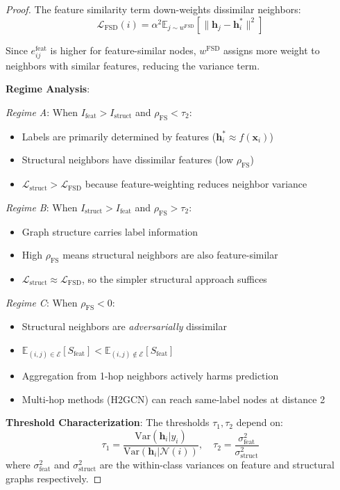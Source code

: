 \begin{proof}
The feature similarity term down-weights dissimilar neighbors:
\begin{equation}
\mathcal{L}_{\text{FSD}}(i) = \alpha^2 \mathbb{E}_{j \sim w^{\text{FSD}}}\left[\|\mathbf{h}_j - \mathbf{h}_i^*\|^2\right]
\end{equation}

Since $e_{ij}^{\text{feat}}$ is higher for feature-similar nodes, $w^{\text{FSD}}$ assigns more weight to neighbors with similar features, reducing the variance term.

\textbf{Regime Analysis}:

\textit{Regime A}: When $I_{\text{feat}} > I_{\text{struct}}$ and $\rho_{\text{FS}} < \tau_2$:
\begin{itemize}
\item Labels are primarily determined by features ($\mathbf{h}_i^* \approx f(\mathbf{x}_i)$)
\item Structural neighbors have dissimilar features (low $\rho_{\text{FS}}$)
\item $\mathcal{L}_{\text{struct}} > \mathcal{L}_{\text{FSD}}$ because feature-weighting reduces neighbor variance
\end{itemize}

\textit{Regime B}: When $I_{\text{struct}} > I_{\text{feat}}$ and $\rho_{\text{FS}} > \tau_2$:
\begin{itemize}
\item Graph structure carries label information
\item High $\rho_{\text{FS}}$ means structural neighbors are also feature-similar
\item $\mathcal{L}_{\text{struct}} \approx \mathcal{L}_{\text{FSD}}$, so the simpler structural approach suffices
\end{itemize}

\textit{Regime C}: When $\rho_{\text{FS}} < 0$:
\begin{itemize}
\item Structural neighbors are \textit{adversarially} dissimilar
\item $\mathbb{E}_{(i,j) \in \mathcal{E}}[S_{\text{feat}}] < \mathbb{E}_{(i,j) \notin \mathcal{E}}[S_{\text{feat}}]$
\item Aggregation from 1-hop neighbors actively harms prediction
\item Multi-hop methods (H2GCN) can reach same-label nodes at distance 2
\end{itemize}

\textbf{Threshold Characterization}: The thresholds $\tau_1, \tau_2$ depend on:
\begin{equation}
\tau_1 = \frac{\text{Var}(\mathbf{h}_i | y_i)}{\text{Var}(\mathbf{h}_i | \mathcal{N}(i))}, \quad \tau_2 = \frac{\sigma_{\text{feat}}^2}{\sigma_{\text{struct}}^2}
\end{equation}
where $\sigma_{\text{feat}}^2$ and $\sigma_{\text{struct}}^2$ are the within-class variances on feature and structural graphs respectively.
\end{proof}


